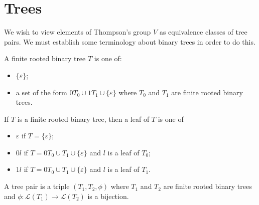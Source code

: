 \section{Trees}

We wish to view elements of Thompson's group \(V\) as equivalence classes of tree pairs. We must establish some terminology about binary trees in order to do this.
\begin{definition}%
  \label{def:rooted_binary_tree}
 A finite rooted binary tree \(T\) is one of:
 \begin{itemize}
     \item \(\{\varepsilon\}\);
     \item a set of the form \(0T_0 \cup 1T_1 \cup \{\varepsilon\}\) where \(T_0\) and \(T_1\) are finite rooted binary trees.
 \end{itemize}
\end{definition}

\begin{definition}%
  \label{def:leaf_of_a_tree}
If \(T\) is a finite rooted binary tree, then a leaf of \(T\) is one of
\begin{itemize}
    \item \(\varepsilon\) if \(T=\{\varepsilon\}\);
    \item \(0l\) if \(T=0T_0 \cup T_1 \cup \{\varepsilon\}\) and \(l\) is a leaf of \(T_0\);
    \item \(1l\) if \(T=0T_0 \cup T_1 \cup \{\varepsilon\}\) and \(l\) is a leaf of \(T_1\).
\end{itemize}
\end{definition}


\begin{definition}%
  \label{def:tree_pair}
A tree pair is a triple \((T_1,T_2,\phi)\) where \(T_1\) and \(T_2\) are finite rooted binary trees and \(\phi:\mathcal{L}(T_1)\to \mathcal{L}(T_2)\) is a bijection.
\end{definition}

